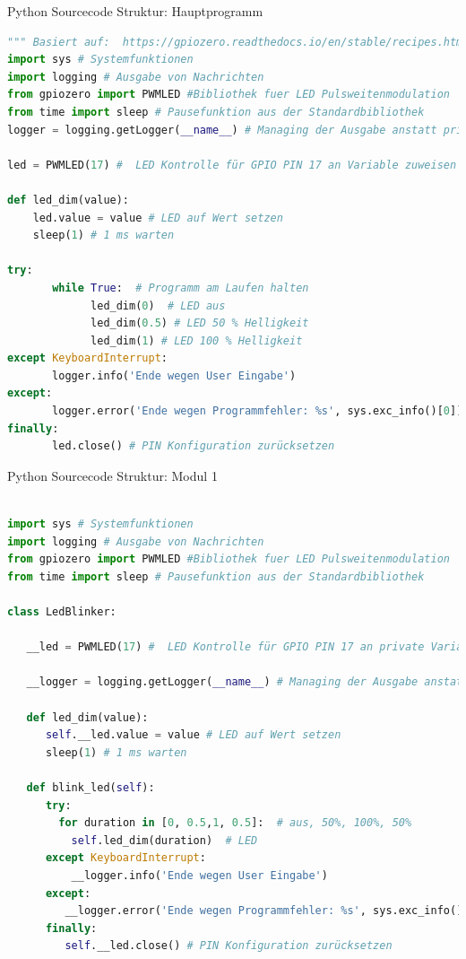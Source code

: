 \begin{frame}[fragile]{Python Sourcecode Struktur: Hauptprogramm}
\begin{lstlisting}[language=Python]
""" Basiert auf:  https://gpiozero.readthedocs.io/en/stable/recipes.html """
import sys # Systemfunktionen
import logging # Ausgabe von Nachrichten
from gpiozero import PWMLED #Bibliothek fuer LED Pulsweitenmodulation
from time import sleep # Pausefunktion aus der Standardbibliothek
logger = logging.getLogger(__name__) # Managing der Ausgabe anstatt print() Funktion

led = PWMLED(17) #  LED Kontrolle für GPIO PIN 17 an Variable zuweisen

def led_dim(value):
    led.value = value # LED auf Wert setzen
    sleep(1) # 1 ms warten

try:
       while True:  # Programm am Laufen halten
             led_dim(0)  # LED aus
             led_dim(0.5) # LED 50 % Helligkeit
             led_dim(1) # LED 100 % Helligkeit
except KeyboardInterrupt:
       logger.info('Ende wegen User Eingabe')
except:
       logger.error('Ende wegen Programmfehler: %s', sys.exc_info()[0])
finally:
       led.close() # PIN Konfiguration zurücksetzen

\end{lstlisting}
\end{frame}


\begin{frame}[fragile]{Python Sourcecode Struktur: Modul 1}
\begin{lstlisting}[language=Python]

import sys # Systemfunktionen
import logging # Ausgabe von Nachrichten
from gpiozero import PWMLED #Bibliothek fuer LED Pulsweitenmodulation
from time import sleep # Pausefunktion aus der Standardbibliothek

class LedBlinker:

   __led = PWMLED(17) #  LED Kontrolle für GPIO PIN 17 an private Variable zuweisen

   __logger = logging.getLogger(__name__) # Managing der Ausgabe anstatt print() Funktion

   def led_dim(value):
      self.__led.value = value # LED auf Wert setzen
      sleep(1) # 1 ms warten

   def blink_led(self):
      try:
        for duration in [0, 0.5,1, 0.5]:  # aus, 50%, 100%, 50%
          self.led_dim(duration)  # LED
      except KeyboardInterrupt:
          __logger.info('Ende wegen User Eingabe')
      except:
         __logger.error('Ende wegen Programmfehler: %s', sys.exc_info()[0]) # siehe https://docs.python.org/3/tutorial/errors.html
      finally:
         self.__led.close() # PIN Konfiguration zurücksetzen

\end{lstlisting}
\end{frame}



